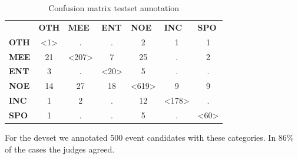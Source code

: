\documentclass[
10pt, %
a4paper, %
oneside, %
headinclude,footinclude, %
BCOR5mm, %
]{scrartcl}
\begin{document}
\begin{table}[h]
\begin{tabular}{lcccccc}
 & \multicolumn{1}{l}{\textbf{OTH}} & \multicolumn{1}{l}{\textbf{MEE}} & \multicolumn{1}{l}{\textbf{ENT}} & \multicolumn{1}{l}{\textbf{NOE}} & \multicolumn{1}{l}{\textbf{INC}} & \multicolumn{1}{l}{\textbf{SPO}} \\ \cline{2-7} 
\multicolumn{1}{l|}{\textbf{OTH}} & \multicolumn{1}{c|}{\textless1\textgreater} & \multicolumn{1}{c|}{.} & \multicolumn{1}{c|}{.} & \multicolumn{1}{c|}{2} & \multicolumn{1}{c|}{1} & \multicolumn{1}{c|}{1} \\ \cline{2-7} 
\multicolumn{1}{l|}{\textbf{MEE}} & \multicolumn{1}{c|}{21} & \multicolumn{1}{c|}{\textless207\textgreater} & \multicolumn{1}{c|}{7} & \multicolumn{1}{c|}{25} & \multicolumn{1}{c|}{.} & \multicolumn{1}{c|}{2} \\ \cline{2-7} 
\multicolumn{1}{l|}{\textbf{ENT}} & \multicolumn{1}{c|}{3} & \multicolumn{1}{c|}{.} & \multicolumn{1}{c|}{\textless20\textgreater} & \multicolumn{1}{c|}{5} & \multicolumn{1}{c|}{.} & \multicolumn{1}{c|}{.} \\ \cline{2-7} 
\multicolumn{1}{l|}{\textbf{NOE}} & \multicolumn{1}{c|}{14} & \multicolumn{1}{c|}{27} & \multicolumn{1}{c|}{18} & \multicolumn{1}{c|}{\textless619\textgreater} & \multicolumn{1}{c|}{9} & \multicolumn{1}{c|}{9} \\ \cline{2-7} 
\multicolumn{1}{l|}{\textbf{INC}} & \multicolumn{1}{c|}{1} & \multicolumn{1}{c|}{2} & \multicolumn{1}{c|}{.} & \multicolumn{1}{c|}{12} & \multicolumn{1}{c|}{\textless178\textgreater} & \multicolumn{1}{c|}{.} \\ \cline{2-7} 
\multicolumn{1}{l|}{\textbf{SPO}} & \multicolumn{1}{c|}{1} & \multicolumn{1}{c|}{.} & \multicolumn{1}{c|}{.} & \multicolumn{1}{c|}{5} & \multicolumn{1}{c|}{.} & \multicolumn{1}{c|}{\textless60\textgreater} \\ \cline{2-7} 
\end{tabular}
\caption[Table caption text]{Confusion matrix testset annotation }
\end{table}

For the devset we annotated 500 event candidates with these categories. In 86\% of the cases the judges agreed.
\end{document}
